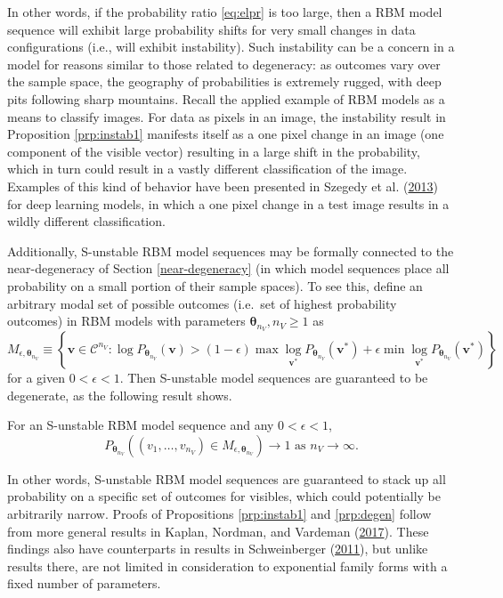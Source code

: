 \documentclass[]{article}
\theoremstyle{definition}
\newcommand{\nv}{{n_{\scriptscriptstyle V}}}
\let\BeginKnitrBlock\begin \let\EndKnitrBlock\end
\begin{document}
In other words, if the probability ratio \eqref{eq:elpr} is too large,
then a RBM model sequence will exhibit large probability shifts for very
small changes in data configurations (i.e., will exhibit instability).
Such instability can be a concern in a model for reasons similar to
those related to degeneracy: as outcomes vary over the sample space, the
geography of probabilities is extremely rugged, with deep pits following
sharp mountains. Recall the applied example of RBM models as a means to
classify images. For data as pixels in an image, the instability result
in Proposition \ref{prp:instab1} manifests itself as a one pixel change
in an image (one component of the visible vector) resulting in a large
shift in the probability, which in turn could result in a vastly
different classification of the image. Examples of this kind of behavior
have been presented in Szegedy et al.
(\protect\hyperlink{ref-szegedy2013intriguing}{2013}) for deep learning
models, in which a one pixel change in a test image results in a wildly
different classification.

Additionally, S-unstable RBM model sequences may be formally connected
to the near-degeneracy of Section \ref{near-degeneracy} (in which model
sequences place all probability on a small portion of their sample
spaces). To see this, define an arbitrary modal set of possible outcomes
(i.e.~set of highest probability outcomes) in RBM models with parameters
\(\boldsymbol \theta_\nv, \nv \ge 1\) as \[
M_{\epsilon, \boldsymbol \theta_\nv} \equiv \left\{\boldsymbol v \in \mathcal{C}^\nv: \log P_{\boldsymbol \theta_\nv}(\boldsymbol v) > (1-\epsilon)\max\log\limits_{\boldsymbol v^*}P_{\boldsymbol \theta_\nv}(\boldsymbol v^*) + \epsilon\min\log\limits_{\boldsymbol v^*}P_{\boldsymbol \theta_\nv}(\boldsymbol v^*) \right\}
\] for a given \(0 < \epsilon < 1\). Then S-unstable model sequences are
guaranteed to be degenerate, as the following result shows.

\BeginKnitrBlock{proposition}
\protect\hypertarget{prp:degen}{}{\label{prp:degen}}For an S-unstable RBM
model sequence and any \(0 < \epsilon < 1\), \[
P_{\boldsymbol \theta_\nv}\left((v_1, \dots, v_\nv) \in M_{\epsilon, \boldsymbol \theta_\nv}\right) \rightarrow 1 \text{ as } \nv \rightarrow \infty.
\]
\EndKnitrBlock{proposition}

In other words, S-unstable RBM model sequences are guaranteed to stack
up all probability on a specific set of outcomes for visibles, which
could potentially be arbitrarily narrow. Proofs of Propositions
\ref{prp:instab1} and \ref{prp:degen} follow from more general results
in Kaplan, Nordman, and Vardeman
(\protect\hyperlink{ref-kaplan2016propriety}{2017}). These findings also
have counterparts in results in Schweinberger
(\protect\hyperlink{ref-schweinberger2011instability}{2011}), but unlike
results there, are not limited in consideration to exponential family
forms with a fixed number of parameters.
\end{document}

